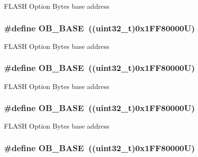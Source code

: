 F\-L\-A\-S\-H Option Bytes base address \hypertarget{group___peripheral__memory__map_gab5b5fb155f9ee15dfb6d757da1adc926}{
\subsubsection[{O\-B\-\_\-\-B\-A\-S\-E}]{\setlength{\rightskip}{0pt plus 5cm}\#define O\-B\-\_\-\-B\-A\-S\-E~((uint32\-\_\-t)0x1\-F\-F80000\-U)}}\label{group___peripheral__memory__map_gab5b5fb155f9ee15dfb6d757da1adc926}
F\-L\-A\-S\-H Option Bytes base address \hypertarget{group___peripheral__memory__map_gab5b5fb155f9ee15dfb6d757da1adc926}{
\subsubsection[{O\-B\-\_\-\-B\-A\-S\-E}]{\setlength{\rightskip}{0pt plus 5cm}\#define O\-B\-\_\-\-B\-A\-S\-E~((uint32\-\_\-t)0x1\-F\-F80000\-U)}}\label{group___peripheral__memory__map_gab5b5fb155f9ee15dfb6d757da1adc926}
F\-L\-A\-S\-H Option Bytes base address \hypertarget{group___peripheral__memory__map_gab5b5fb155f9ee15dfb6d757da1adc926}{
\subsubsection[{O\-B\-\_\-\-B\-A\-S\-E}]{\setlength{\rightskip}{0pt plus 5cm}\#define O\-B\-\_\-\-B\-A\-S\-E~((uint32\-\_\-t)0x1\-F\-F80000\-U)}}\label{group___peripheral__memory__map_gab5b5fb155f9ee15dfb6d757da1adc926}
F\-L\-A\-S\-H Option Bytes base address \hypertarget{group___peripheral__memory__map_gab5b5fb155f9ee15dfb6d757da1adc926}{
\subsubsection[{O\-B\-\_\-\-B\-A\-S\-E}]{\setlength{\rightskip}{0pt plus 5cm}\#define O\-B\-\_\-\-B\-A\-S\-E~((uint32\-\_\-t)0x1\-F\-F80000\-U)}}\label{group___peripheral__memory__map_gab5b5fb155f9ee15dfb6d757da1adc926}
